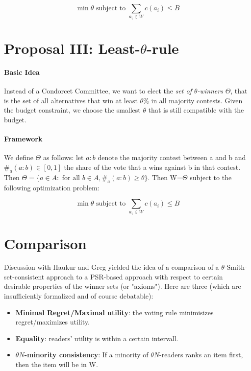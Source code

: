 \documentclass[10pt,a4paper]{article}
\begin{document}
\[\min \theta \text{ subject to } \sum_{a_i\in W}c(a_i)\leq B\]

\section {Proposal III: Least-$\theta$-rule}

\paragraph{Basic Idea}

Instead of a Condorcet Committee, we want to elect the \emph {set of $\theta$-winners} $\Theta$, that is the set
of all alternatives that win at least $\theta \% $ in all majority contests. Given the budget constraint, we
choose the smallest $\theta$ that is still compatible with the budget.

\paragraph{Framework}

We define $\Theta$ as follows: let $a:b$ denote the majority contest between a and b and $\#_a(a:b)\in [0,1]$ the
share of the vote that a wins against b in that contest. Then $\Theta=\{a\in A: \text { for all } b\in A, \#_a(a:b)\geq \theta\}$. Then W=$\Theta$ subject to the following optimization problem:

\[\min \theta \text{ subject to } \sum_{a_i\in W}c(a_i)\leq B\]

\section{Comparison}

Discussion with Haukur and Greg yielded the idea of a comparison of a $\theta$-Smith-set-consistent approach to a PSR-based approach with respect
to certain desirable properties of the winner sets (or "axioms"). Here are three (which are insufficiently formalized and of course debatable):

\begin{itemize}
\item \textbf{Minimal Regret/Maximal utility}: the voting rule minimisizes regret/maximizes utility.
\item \textbf{Equality}: readers' utility is within a certain intervall.
\item \textbf{$\theta N$-minority consistency}: If a minority of $\theta N$-readers ranks an item first, then the item will be in W.



\end{itemize}
\end{document}
